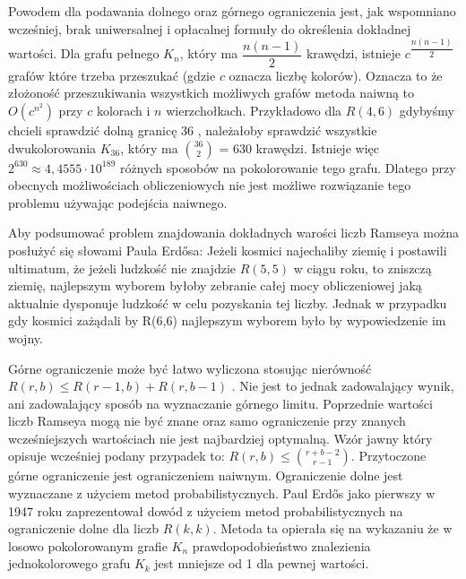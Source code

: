 Powodem dla podawania dolnego oraz górnego ograniczenia jest, jak wspomniano wcześniej, brak uniwersalnej i opłacalnej formuły do określenia dokładnej wartości. Dla grafu pełnego $\mathit{K}_{n}$, który ma ${\dfrac{n(n-1)}{2}}$ krawędzi, istnieje $c^{\dfrac{n(n-1)}{2}}$ grafów które trzeba przeszukać (gdzie $c$ oznacza liczbę kolorów). Oznacza to że złożoność przeszukiwania wszystkich możliwych grafów metoda naiwną to $O(c^{n^{2}})$ przy $c$ kolorach i $n$ wierzchołkach. Przykładowo dla $R(4,6)$ gdybyśmy chcieli sprawdzić dolną granicę 36 \cite{smallramsey}, należałoby sprawdzić wszystkie dwukolorowania $\mathit{K}_{36}$, który ma ${36\choose 2}$ = 630 krawędzi. Istnieje więc $2^{630} \approx 4,4555 \cdot 10^{189}$ różnych sposobów na pokolorowanie tego grafu. Dlatego przy obecnych możliwościach obliczeniowych nie jest możliwe rozwiązanie tego problemu używając podejścia naiwnego. \par

Aby podsumować problem znajdowania dokładnych warości liczb Ramseya można posłużyć się słowami Paula Erdősa: Jeżeli kosmici najechaliby ziemię i postawili ultimatum, że jeżeli ludzkość nie znajdzie $R(5,5)$ w ciągu roku, to zniszczą ziemię, najlepszym wyborem byłoby zebranie całej mocy obliczeniowej jaką aktualnie dysponuje ludzkość w celu pozyskania tej liczby. Jednak w przypadku gdy kosmici zażądali by R(6,6) najlepszym wyborem było by wypowiedzenie im wojny.\cite{aliens}  \par

\hfill \par

Górne ograniczenie może być łatwo wyliczona stosując nierówność $R(r,b) \le R(r-1,b)+R(r,b-1)$ \cite{graniceupdown}. Nie jest to jednak zadowalający wynik, ani zadowalający sposób na wyznaczanie górnego limitu. Poprzednie wartości liczb Ramseya mogą nie być znane oraz samo ograniczenie przy znanych wcześniejszych wartościach nie jest najbardziej optymalną. Wzór jawny który opisuje wcześniej podany przypadek to: $R(r,b) \le {r+b-2\choose r-1}$. Przytoczone górne ograniczenie jest ograniczeniem naiwnym. Ograniczenie dolne jest wyznaczane z użyciem metod probabilistycznych. Paul Erdős jako pierwszy w 1947 roku zaprezentował dowód z użyciem metod probabilistycznych na ograniczenie dolne dla liczb $R(k,k)$\cite{erdogranica, theory}. Metoda ta opierała się na wykazaniu że w losowo pokolorowanym grafie $\mathit{K}_{n}$ prawdopodobieństwo znalezienia jednokolorowego grafu $\mathit{K}_{k}$ jest mniejsze od 1 dla pewnej wartości.


